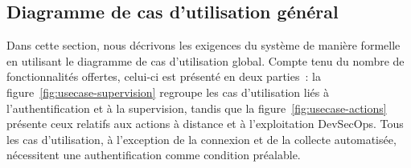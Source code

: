 
\subsection{Diagramme de cas d'utilisation général}
Dans cette section, nous décrivons les exigences du système de manière formelle en
utilisant le diagramme de cas d'utilisation global. Compte tenu du nombre de
fonctionnalités offertes, celui-ci est présenté en deux parties~: la
figure~\ref{fig:usecase-supervision} regroupe les cas d'utilisation liés à
l'authentification et à la supervision, tandis que la
figure~\ref{fig:usecase-actions} présente ceux relatifs aux actions à distance et à
l'exploitation DevSecOps. Tous les cas d'utilisation, à l'exception de la connexion et
de la collecte automatisée, nécessitent une authentification comme condition préalable.

